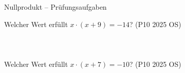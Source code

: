 \setcounter{aufgabe}{3}

\begin{aufgabe}{Nullprodukt – Prüfungsaufgaben}
\begin{teile}
\teil Welcher Wert erfüllt $x \cdot (x + 9) = -14$? \hfill (P10 2025 OS)\\  \\  \\  \\ 
\teil Welcher Wert erfüllt $x \cdot (x + 7) = -10$? \hfill (P10 2025 OS)\\  \\  \\  \\ 
\end{teile}
\end{aufgabe}
